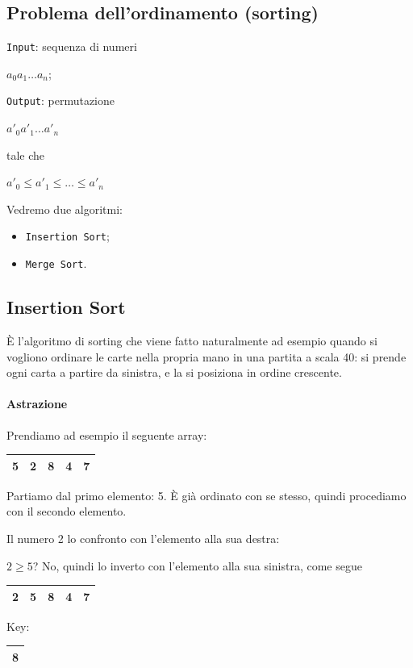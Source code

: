 \subsection{Problema dell'ordinamento (sorting)}
\texttt{Input}: sequenza di numeri 
\begin{center}
	$a_0 a_1 \dots a_n$;\par
\end{center}
\texttt{Output}: permutazione
\begin{center}
	$a'_0 a'_1 \dots a'_n$
\end{center}
tale che 
\begin{center}
	$a'_0 \leq a'_1 \leq \dots \leq a'_n$
\end{center}

Vedremo due algoritmi:
\begin{itemize}[noitemsep]
	\item \texttt{Insertion Sort};
	\item \texttt{Merge Sort}.
\end{itemize}

\subsection{Insertion Sort}
È l'algoritmo di sorting che viene fatto naturalmente ad esempio quando si vogliono ordinare le carte nella propria mano in una partita a scala 40: si prende ogni carta a partire da sinistra, e la si posiziona in ordine crescente.\par
\paragraph{Astrazione} Prendiamo ad esempio il seguente array:

\begin{center}
	\begin{tabular}{|l|l|l|l|l|}
		\hline
		5 & 2 & 8 & 4 & 7 \\
		\hline
	\end{tabular}
\end{center}
	
Partiamo dal primo elemento: 5. È già ordinato con se stesso, quindi procediamo con il secondo elemento.\par
Il numero 2 lo confronto con l'elemento alla sua destra: \par
$2 \geq 5$?  No, quindi lo inverto con l'elemento alla sua sinistra, come segue

\begin{center}
	\begin{tabular}{|l|l|l|l|l|}
		\hline
		2 & 5 & 8 & 4 & 7 \\
		\hline
	\end{tabular}
	\hspace{1cm} Key: 
	\begin{tabular}{|l|}
		\hline
		8 \\
		\hline
	\end{tabular}
\end{center}

